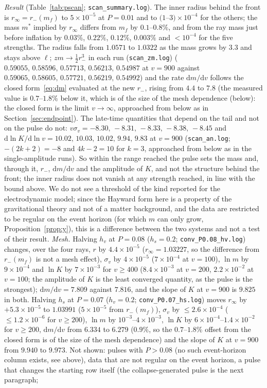 \documentclass[11pt]{article}
\begin{document}
\emph{Result} (Table~\ref{tab:pscan}; \texttt{scan\_summary.log}). The inner radius behind the front is $r_\infty=r_-(m_f)$ to $5\times10^{-5}$ at $P=0.01$ and to $(1$--$3)\times10^{-4}$ for the others; the mass $m^{*}$ implied by $r_\infty$ differs from $m_f$ by $0.1$--$0.8\%$, and from the ray mass just before inflation by $0.03\%$, $0.22\%$, $0.12\%$, $0.003\%$ and $<10^{-4}$ for the five strengths. The radius falls from $1.0571$ to $1.0322$ as the mass grows by $3.3$ and stays above $\ell$; $zm\to\tfrac12r_-^{3}$ in each run (\texttt{scan\_zm.log}) ($0.59055,\,0.58596,\,0.57713,\,0.56213,\,0.54987$ at $v=900$ against $0.59065,\,0.58605,\,0.57721,\,0.56219,\,0.54992$) and the rate $\mathrm dm/\mathrm dv$ follows the closed form~\eqref{eq:dm} evaluated at the new $r_-$, rising from $4.4$ to $7.8$ (the measured value is $0.7$--$1.8\%$ below it, which is of the size of the mesh dependence (below): the closed form is the limit $v\to\infty$, approached from below as in Section~\ref{sec:endpoint}). The late-time quantities that depend on the tail and not on the pulse do not: $v\sigma_v=-8.30,\,-8.31,\,-8.33,\,-8.38,\,-8.45$ and $\mathrm d\ln K/\mathrm d\ln v=10.02,\,10.03,\,10.02,\,9.94,\,9.83$ at $v=900$ (\texttt{scan\_an.log}; $-(2k+2)=-8$ and $4k-2=10$ for $k=3$, approached from below as in the single-amplitude runs). So within the range reached the pulse sets the mass and, through it, $r_-$, $\mathrm dm/\mathrm dv$ and the amplitude of $K$, and not the structure behind the front; the inner radius does not vanish at any strength reached, in line with the bound above. We do not see a threshold of the kind reported for the electrodynamic model; since the Hayward form here is a property of the gravitational theory and not of a matter background, and the data are restricted to be regular on the event horizon (for which $m$ can only grow, Proposition~\ref{prop:y}), this is a difference between the two systems and not a test of their result. \emph{Mesh.} Halving $h_v$ at $P=0.08$ ($h_s=0.2$; \texttt{conv\_P0.08\_hv.log}) changes, over the four rays, $r$ by $4.4\times10^{-5}$ ($r_\infty=1.03227$, so the difference from $r_-(m_f)$ is not a mesh effect), $\sigma_v$ by $4\times10^{-5}$ ($7\times10^{-4}$ at $v=100$), $\ln m$ by $9\times10^{-4}$ and $\ln K$ by $7\times10^{-3}$ for $v\ge400$ ($8.4\times10^{-3}$ at $v=200$, $2.2\times10^{-2}$ at $v=100$; the amplitude of $K$ is the least converged quantity, as the pulse is the strongest); $\mathrm dm/\mathrm dv=7.809$ against $7.816$, and the slope of $K$ at $v=900$ is $9.825$ in both. Halving $h_s$ at $P=0.07$ ($h_v=0.2$; \texttt{conv\_P0.07\_hs.log}) moves $r_\infty$ by $+5.3\times10^{-5}$ to $1.03991$ ($5\times10^{-5}$ from $r_-(m_f)$), $\sigma_v$ by $\le2.6\times10^{-4}$ ($\le1.2\times10^{-6}$ for $v\ge200$), $\ln m$ by $10^{-3}$--$4\times10^{-3}$, $\ln K$ by $6\times10^{-4}$--$1.4\times10^{-2}$ for $v\ge200$, $\mathrm dm/\mathrm dv$ from $6.334$ to $6.279$ ($0.9\%$, so the $0.7$--$1.8\%$ offset from the closed form is of the size of the mesh dependence) and the slope of $K$ at $v=900$ from $9.940$ to $9.973$. Not shown: pulses with $P>0.08$ (no such event-horizon column exists, see above), data that are not regular on the event horizon, a pulse that changes the starting row itself (the collapse-generated pulse is the next paragraph; 
\end{document}

